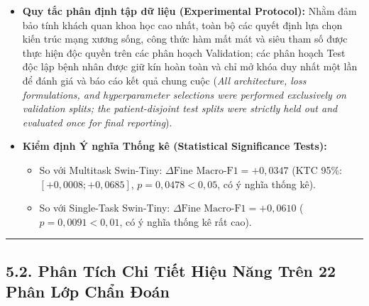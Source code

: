 \documentclass[
  10pt,
  a4paper,
  twocolumn]{article}
\providecommand{\tightlist}{%
  \setlength{\itemsep}{0pt}\setlength{\parskip}{0pt}}
\begin{document}
\begin{itemize}
\item
  \textbf{Quy tắc phân định tập dữ liệu (Experimental Protocol):} Nhằm
  đảm bảo tính khách quan khoa học cao nhất, toàn bộ các quyết định lựa
  chọn kiến trúc mạng xương sống, công thức hàm mất mát và siêu tham số
  được thực hiện độc quyền trên các phân hoạch Validation; các phân
  hoạch Test độc lập bệnh nhân được giữ kín hoàn toàn và chỉ mở khóa duy
  nhất một lần để đánh giá và báo cáo kết quả chung cuộc (\emph{All
  architecture, loss formulations, and hyperparameter selections were
  performed exclusively on validation splits; the patient-disjoint test
  splits were strictly held out and evaluated once for final
  reporting}).
\item
  \textbf{Kiểm định Ý nghĩa Thống kê (Statistical Significance Tests):}

  \begin{itemize}
  \tightlist
  \item
    So với Multitask Swin-Tiny:
    \(\Delta \text{Fine Macro-F1} = +0{,}0347\) (KTC 95\%:
    \([+0{,}0008; +0{,}0685]\), \(p = 0{,}0478 < 0{,}05\), có ý nghĩa
    thống kê).
  \item
    So với Single-Task Swin-Tiny:
    \(\Delta \text{Fine Macro-F1} = +0{,}0610\)
    (\(p = 0{,}0091 < 0{,}01\), có ý nghĩa thống kê rất cao).
  \end{itemize}
\end{itemize}

\begin{center}\rule{0.5\linewidth}{0.5pt}\end{center}

\subsection{5.2. Phân Tích Chi Tiết Hiệu Năng Trên 22 Phân Lớp Chẩn
Đoán}\label{phuxe2n-tuxedch-chi-tiux1ebft-hiux1ec7u-nux103ng-truxean-22-phuxe2n-lux1edbp-chux1ea9n-ux111ouxe1n}
\end{document}
